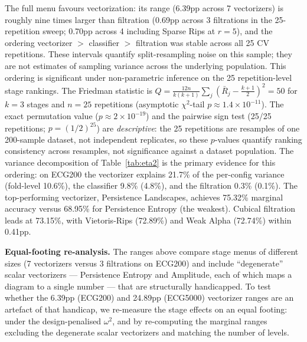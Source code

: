 \documentclass[12pt, a4paper]{report}
\theoremstyle{definition}
\theoremstyle{plain}
\theoremstyle{remark}
\begin{document}
The full menu favours vectorization: its range (6.39pp across 7
vectorizers) is roughly nine times larger than filtration (0.69pp across 3
filtrations in the 25-repetition sweep; 0.70pp across 4 including
Sparse Rips at $r{=}5$), and the ordering vectorizer $>$ classifier
$>$ filtration was stable across all 25 CV repetitions. These
intervals quantify split-resampling noise on this sample; they are not
estimates of sampling variance across the underlying population. This
ordering is significant under non-parametric inference on the
25 repetition-level stage rankings. The Friedman statistic is
$Q = \frac{12n}{k(k+1)}\sum_j (\bar{R}_j - \frac{k+1}{2})^2 = 50$
for $k{=}3$ stages and $n{=}25$ repetitions (asymptotic $\chi^2$-tail
$p \approx 1.4\times10^{-11}$). The exact permutation value
($p \approx 2\times10^{-19}$) and the pairwise sign test (25/25
repetitions; $p = (1/2)^{25}$) are \emph{descriptive}: the 25
repetitions are resamples of one 200-sample dataset, not independent
replicates, so these $p$-values quantify ranking consistency across
resamples, not significance against a dataset population. The variance
decomposition of Table~\ref{tab:eta2} is the primary evidence for
this ordering: on ECG200 the vectorizer explains 21.7\% of the
per-config variance (fold-level 10.6\%), the classifier 9.8\%
(4.8\%), and the filtration 0.3\% (0.1\%). The top-performing
vectorizer, Persistence Landscapes, achieves 75.32\% marginal
accuracy versus 68.95\% for Persistence Entropy (the weakest).
Cubical filtration leads at 73.15\%, with Vietoris-Rips (72.89\%)
and Weak Alpha (72.74\%) within 0.41pp.

\textbf{Equal-footing re-analysis.} The ranges above compare stage
menus of different sizes (7 vectorizers versus 3 filtrations on
ECG200) and include ``degenerate'' scalar vectorizers --- Persistence
Entropy and Amplitude, each of which maps a diagram to a single
number --- that are structurally handicapped. To test whether the
6.39pp (ECG200) and 24.89pp (ECG5000) vectorizer ranges are an
artefact of that handicap, we re-measure the stage effects on an
equal footing: under the design-penalised $\omega^2$, and by
re-computing the marginal ranges excluding the degenerate scalar
vectorizers and matching the number of levels.
\end{document}
